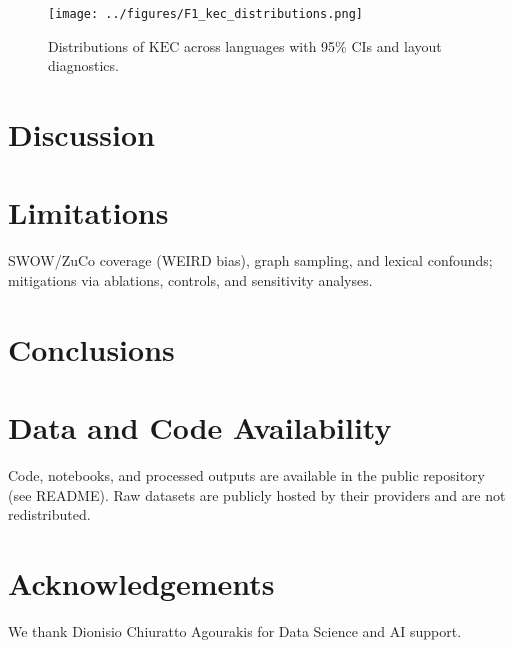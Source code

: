 \documentclass[11pt]{article}
\newcommand{\kec}{\ensuremath{\mathrm{KEC}}}
\begin{document}
\begin{figure}[ht]
  \centering
  \texttt{[image: ../figures/F1\_kec\_distributions.png]}
  \caption{Distributions of \kec{} across languages with 95\% CIs and layout diagnostics.}
  \label{fig:F1}
\end{figure}

\section{Discussion}

\section{Limitations}
SWOW/ZuCo coverage (WEIRD bias), graph sampling, and lexical confounds; mitigations via ablations, controls, and sensitivity analyses.

\section{Conclusions}

\section*{Data and Code Availability}
Code, notebooks, and processed outputs are available in the public repository (see README). Raw datasets are publicly hosted by their providers and are not redistributed.

\section*{Acknowledgements}
We thank Dionisio Chiuratto Agourakis for Data Science and AI support.
\printbibliography
\end{document}
